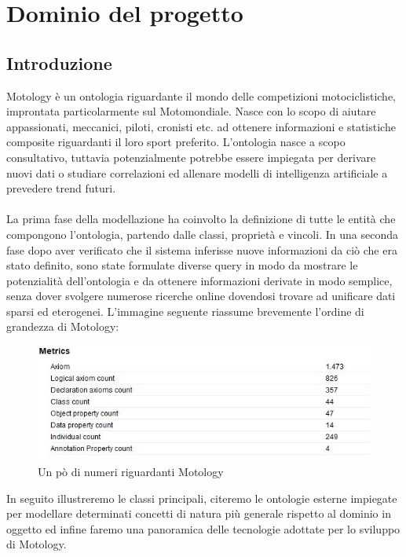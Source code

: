 \chapter{Dominio del progetto}

\section{Introduzione}
Motology è un ontologia riguardante il mondo delle competizioni motociclistiche, improntata particolarmente sul Motomondiale. Nasce con lo scopo di aiutare appassionati, meccanici, piloti, cronisti etc. ad ottenere informazioni e statistiche composite riguardanti il loro sport preferito. L'ontologia nasce a scopo consultativo, tuttavia potenzialmente potrebbe essere impiegata per derivare nuovi dati o studiare correlazioni ed allenare modelli di intelligenza artificiale a prevedere trend futuri. 
\\\\
La prima fase della modellazione ha coinvolto la definizione di tutte le entità che compongono l'ontologia, partendo dalle classi, proprietà e vincoli. In una seconda fase dopo aver verificato che il sistema inferisse nuove informazioni da ciò che era stato definito, sono state formulate diverse query in modo da mostrare le potenzialità dell'ontologia e da ottenere informazioni derivate in modo semplice, senza dover svolgere numerose ricerche online dovendosi trovare ad unificare dati sparsi ed eterogenei. L'immagine seguente riassume brevemente l'ordine di grandezza di Motology:
\\
\begin{figure}[H]
    \begin{center}
        \includegraphics[scale=0.9]{img/statistiche.jpg}
       \caption{Un pò di numeri riguardanti Motology} 
    \end{center}
\end{figure}

In seguito illustreremo le classi principali, citeremo le ontologie esterne impiegate per modellare determinati concetti di natura più generale rispetto al dominio in oggetto ed infine faremo una panoramica delle tecnologie adottate per lo sviluppo di Motology.


